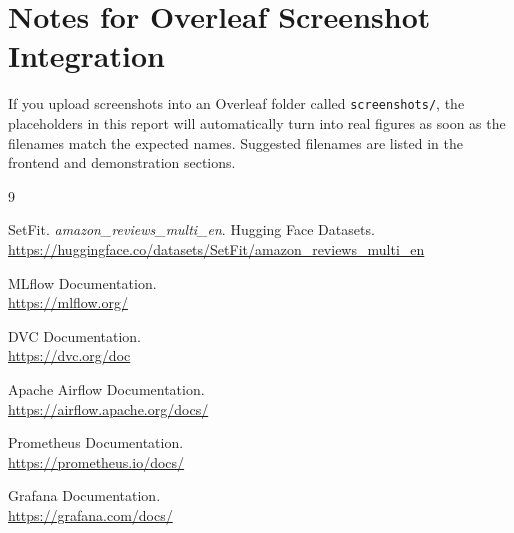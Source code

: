 \documentclass[11pt,a4paper]{article}
\begin{document}
\section{Notes for Overleaf Screenshot Integration}

If you upload screenshots into an Overleaf folder called \texttt{screenshots/}, the placeholders in this report will automatically turn into real figures as soon as the filenames match the expected names. Suggested filenames are listed in the frontend and demonstration sections.

\begin{thebibliography}{9}

SetFit. \emph{amazon\_reviews\_multi\_en}. Hugging Face Datasets.\\
\url{https://huggingface.co/datasets/SetFit/amazon_reviews_multi_en}

MLflow Documentation.\\
\url{https://mlflow.org/}

DVC Documentation.\\
\url{https://dvc.org/doc}

Apache Airflow Documentation.\\
\url{https://airflow.apache.org/docs/}

Prometheus Documentation.\\
\url{https://prometheus.io/docs/}

Grafana Documentation.\\
\url{https://grafana.com/docs/}

\end{thebibliography}
\end{document}
